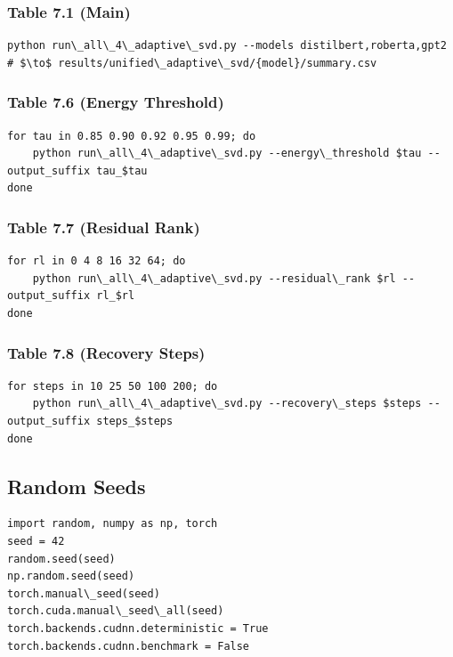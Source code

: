 \subsubsection{Table 7.1 (Main)}

\begin{lstlisting}
python run\_all\_4\_adaptive\_svd.py --models distilbert,roberta,gpt2
# $\to$ results/unified\_adaptive\_svd/{model}/summary.csv
\end{lstlisting}

\subsubsection{Table 7.6 (Energy Threshold)}

\begin{lstlisting}
for tau in 0.85 0.90 0.92 0.95 0.99; do
    python run\_all\_4\_adaptive\_svd.py --energy\_threshold $tau --output_suffix tau_$tau
done
\end{lstlisting}

\subsubsection{Table 7.7 (Residual Rank)}

\begin{lstlisting}
for rl in 0 4 8 16 32 64; do
    python run\_all\_4\_adaptive\_svd.py --residual\_rank $rl --output_suffix rl_$rl
done
\end{lstlisting}

\subsubsection{Table 7.8 (Recovery Steps)}

\begin{lstlisting}
for steps in 10 25 50 100 200; do
    python run\_all\_4\_adaptive\_svd.py --recovery\_steps $steps --output_suffix steps_$steps
done
\end{lstlisting}

\subsection{Random Seeds}

\begin{lstlisting}
import random, numpy as np, torch
seed = 42
random.seed(seed)
np.random.seed(seed)
torch.manual\_seed(seed)
torch.cuda.manual\_seed\_all(seed)
torch.backends.cudnn.deterministic = True
torch.backends.cudnn.benchmark = False
\end{lstlisting}

